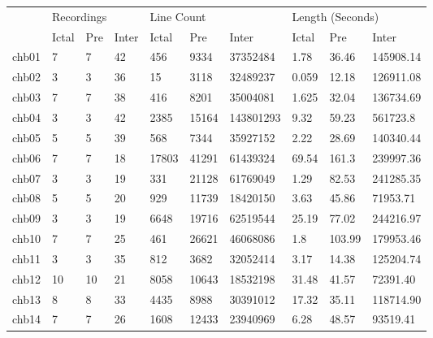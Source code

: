 \documentclass[12pt]{article}
\begin{document}
\begin{table}[H]
\centering
\begin{center}
\begin{tabular}{l|lll|lll|lll}
      & \multicolumn{3}{l|}{Recordings} & \multicolumn{3}{l|}{Line Count} & \multicolumn{3}{l}{Length (Seconds)} \\
      & Ictal     & Pre     & Inter     & Ictal   & Pre     & Inter       & Ictal     & Pre       & Inter        \\ 
chb01 & 7         & 7       & 42        & 456     & 9334    & 37352484    & 1.78      & 36.46     & 145908.14    \\
chb02 & 3         & 3       & 36        & 15      & 3118    & 32489237    & 0.059     & 12.18     & 126911.08    \\
chb03 & 7         & 7       & 38        & 416     & 8201    & 35004081    & 1.625     & 32.04     & 136734.69    \\
chb04 & 3         & 3       & 42        & 2385    & 15164   & 143801293   & 9.32      & 59.23     & 561723.8     \\
chb05 & 5         & 5       & 39        & 568     & 7344    & 35927152    & 2.22      & 28.69     & 140340.44    \\
chb06 & 7         & 7       & 18        & 17803   & 41291   & 61439324    & 69.54     & 161.3     & 239997.36    \\
chb07 & 3         & 3       & 19        & 331     & 21128   & 61769049    & 1.29      & 82.53     & 241285.35    \\
chb08 & 5         & 5       & 20        & 929     & 11739   & 18420150    & 3.63      & 45.86     & 71953.71     \\
chb09 & 3         & 3       & 19        & 6648    & 19716   & 62519544    & 25.19     & 77.02     & 244216.97    \\
chb10 & 7         & 7       & 25        & 461     & 26621   & 46068086    & 1.8       & 103.99    & 179953.46    \\
chb11 & 3         & 3       & 35        & 812     & 3682    & 32052414    & 3.17      & 14.38     & 125204.74    \\
chb12 & 10        & 10      & 21        & 8058    & 10643   & 18532198    & 31.48     & 41.57     & 72391.40     \\
chb13 & 8         & 8       & 33        & 4435    & 8988    & 30391012    & 17.32     & 35.11     & 118714.90    \\
chb14 & 7         & 7       & 26        & 1608    & 12433   & 23940969    & 6.28      & 48.57     & 93519.41     \\

\end{tabular}
\end{center}
\end{table}
\end{document}
